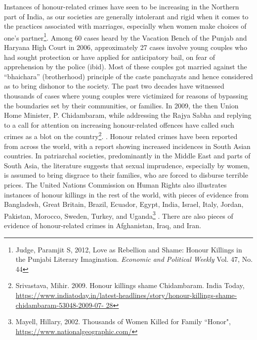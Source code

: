 \setcounter{figure}{0}
\setcounter{table}{0}
\setcounter{footnote}{0}

\label{2016-art3}

\vspace{-.3cm}




\begin{multicols}{2}


\noi
Instances of honour-related crimes have seen to be increasing in the Northern part of
India, as our societies are generally intolerant and rigid when it comes to the practices
associated with marriages, especially when women make choices of one’s partner\footnote{Judge, Paramjit S, 2012, Love as Rebellion and Shame: Honour Killings in the Punjabi Literary
Imagination. \textit{Economic and Political Weekly} Vol. 47, No. 44}. Among 60 cases heard by the Vacation Bench of the Punjab and Haryana High Court
in 2006, approximately 27 cases involve young couples who had sought protection or
have applied for anticipatory bail, on fear of apprehension by the police (ibid). Most of
these couples got married against the “bhaichara” (brotherhood) principle of the caste
panchayats and hence considered as to bring dishonor to the society. The past two
decades have witnessed thousands of cases where young couples were victimized for
reasons of bypassing the boundaries set by their communities, or families. In 2009, the
then Union Home Minister, P. Chidambaram, while addressing the Rajya Sabha and
replying to a call for attention on increasing honour-related offences have called such
crimes as a blot on the country\footnote{Srivastava, Mihir. 2009. Honour killings shame Chidambaram. India Today,
\url{https://www.indiatoday.in/latest-headlines/story/honour-killings-shame-chidambaram-53048-2009-07-
28}}.
.
\noi
Honour related crimes have been reported from across the world, with a report showing
increased incidences in South Asian countries. In patriarchal societies, predominantly
in the Middle East and parts of South Asia, the literature suggests that sexual
imprudence, especially by women, is assumed to bring disgrace to their families, who
are forced to disburse terrible prices. The United Nations Commission on Human
Rights also illustrates instances of honour killings in the rest of the world, with pieces
of evidence from Bangladesh, Great Britain, Brazil, Ecuador, Egypt, India, Israel, Italy,
Jordan, Pakistan, Morocco, Sweden, Turkey, and Uganda\footnote{Mayell, Hillary, 2002. Thousands of Women Killed for Family “Honor",
\url{https://www.nationalgeographic.com/}}
. There are also pieces of
evidence of honour-related crimes in Afghanistan, Iraq, and Iran.


\end{multicols}
